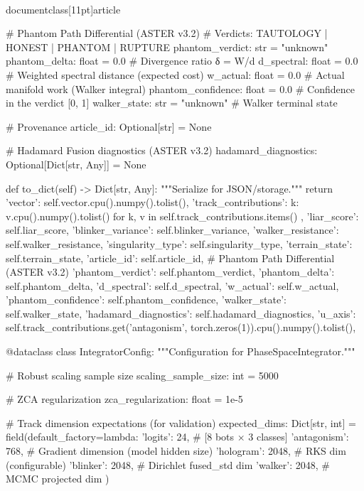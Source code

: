 \\documentclass[11pt]{article}
\begin{document}
\begin{CodeBlock}
    # Phantom Path Differential (ASTER v3.2)
    # Verdicts: TAUTOLOGY | HONEST | PHANTOM | RUPTURE
    phantom_verdict: str = "unknown"
    phantom_delta: float = 0.0        # Divergence ratio δ = W/d
    d_spectral: float = 0.0           # Weighted spectral distance (expected cost)
    w_actual: float = 0.0             # Actual manifold work (Walker integral)
    phantom_confidence: float = 0.0   # Confidence in the verdict [0, 1]
    walker_state: str = "unknown"     # Walker terminal state

    # Provenance
    article_id: Optional[str] = None

    # Hadamard Fusion diagnostics (ASTER v3.2)
    hadamard_diagnostics: Optional[Dict[str, Any]] = None

    def to_dict(self) -> Dict[str, Any]:
        """Serialize for JSON/storage."""
        return {
            'vector': self.vector.cpu().numpy().tolist(),
            'track_contributions': {
                k: v.cpu().numpy().tolist()
                for k, v in self.track_contributions.items()
            },
            'liar_score': self.liar_score,
            'blinker_variance': self.blinker_variance,
            'walker_resistance': self.walker_resistance,
            'singularity_type': self.singularity_type,
            'terrain_state': self.terrain_state,
            'article_id': self.article_id,
            # Phantom Path Differential (ASTER v3.2)
            'phantom_verdict': self.phantom_verdict,
            'phantom_delta': self.phantom_delta,
            'd_spectral': self.d_spectral,
            'w_actual': self.w_actual,
            'phantom_confidence': self.phantom_confidence,
            'walker_state': self.walker_state,
            'hadamard_diagnostics': self.hadamard_diagnostics,
            'u_axis': self.track_contributions.get('antagonism', torch.zeros(1)).cpu().numpy().tolist(),
        }


@dataclass
class IntegratorConfig:
    """Configuration for PhaseSpaceIntegrator."""

    # Robust scaling sample size
    scaling_sample_size: int = 5000

    # ZCA regularization
    zca_regularization: float = 1e-5

    # Track dimension expectations (for validation)
    expected_dims: Dict[str, int] = field(default_factory=lambda: {
        'logits': 24,           # [8 bots × 3 classes]
        'antagonism': 768,      # Gradient dimension (model hidden size)
        'hologram': 2048,       # RKS dim (configurable)
        'blinker': 2048,        # Dirichlet fused_std dim
        'walker': 2048,         # MCMC projected dim
    })


\end{CodeBlock}
\end{document}
